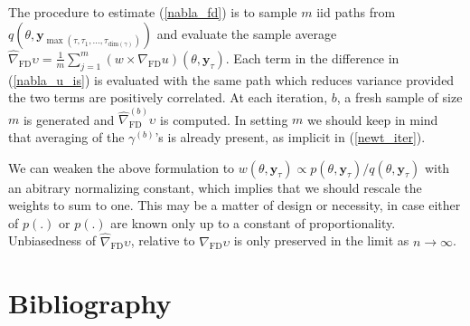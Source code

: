 \documentclass[11pt]{article}
\begin{document}
The procedure to estimate (\ref{nabla_fd}) is to sample $m$ iid paths from $q(\theta,\mathbf{y}_{\max(\tau,\tau_1,...,\tau_{\mathrm{dim}(\gamma)})})$ and evaluate the sample average $\widehat\nabla_{\mathrm{FD}}\upsilon=\frac{1}{m}\sum_{j=1}^m (w\times\nabla_{\mathrm{FD}}u)(\theta,\mathbf{y}_{\tau})$.
Each term in the difference in (\ref{nabla_u_is}) is evaluated with the same path which reduces variance provided the two terms are positively correlated. At each iteration, $b$, a fresh sample of size $m$ is generated and $\hat \nabla_{\mathrm{FD}}^{(b)}\upsilon$ is computed. In setting $m$ we should keep in mind that averaging of the $\gamma^{(b)}$'s is already present, as implicit in (\ref{newt_iter}). 

We can weaken the above formulation to $w(\theta,\mathbf{y}_{\tau}) \propto p(\theta,\mathbf{y}_\tau) / q(\theta,\mathbf{y}_\tau)$ with an abitrary normalizing constant, which implies that we should rescale the weights to sum to one.
This may be a matter of design\cite{Hesterb1995} or necessity, in case either of $p(.)$ or $p(.)$ are known only up to a constant of proportionality.
Unbiasedness of $\hat \nabla_{\mathrm{FD}}\upsilon$, relative to $\nabla_{\mathrm{FD}}\upsilon$ is only preserved in the limit as $n\rightarrow \infty$.

\section*{Bibliography}
\printbibliography[heading=none]
\end{document}
